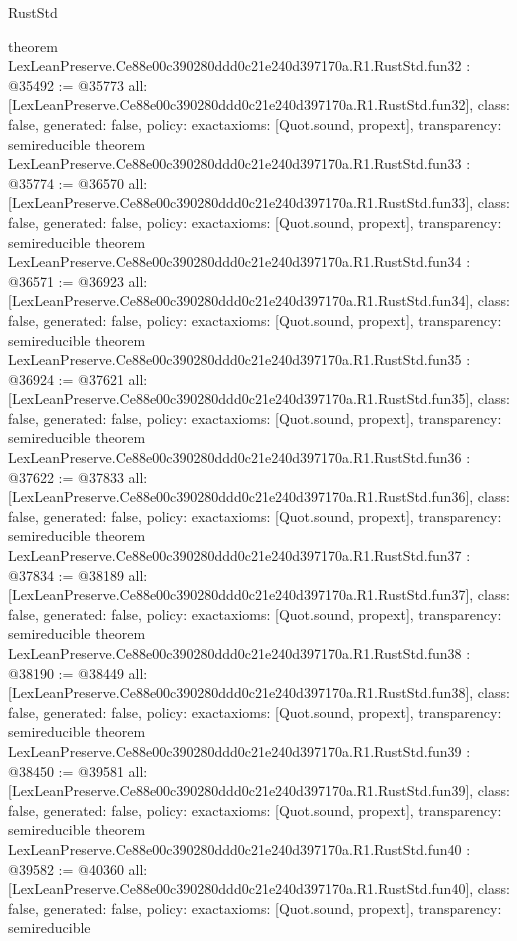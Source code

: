 \begin{lexlean}{RustStd}
\begin{coremodule}
{}
theorem LexLeanPreserve.Ce88e00c390280ddd0c21e240d397170a.R1.RustStd.fun32 : @35492 := @35773 {
  all: [LexLeanPreserve.Ce88e00c390280ddd0c21e240d397170a.R1.RustStd.fun32],
  class: false,
  generated: false,
  policy: exact{axioms: [Quot.sound, propext]},
  transparency: semireducible
}
theorem LexLeanPreserve.Ce88e00c390280ddd0c21e240d397170a.R1.RustStd.fun33 : @35774 := @36570 {
  all: [LexLeanPreserve.Ce88e00c390280ddd0c21e240d397170a.R1.RustStd.fun33],
  class: false,
  generated: false,
  policy: exact{axioms: [Quot.sound, propext]},
  transparency: semireducible
}
theorem LexLeanPreserve.Ce88e00c390280ddd0c21e240d397170a.R1.RustStd.fun34 : @36571 := @36923 {
  all: [LexLeanPreserve.Ce88e00c390280ddd0c21e240d397170a.R1.RustStd.fun34],
  class: false,
  generated: false,
  policy: exact{axioms: [Quot.sound, propext]},
  transparency: semireducible
}
theorem LexLeanPreserve.Ce88e00c390280ddd0c21e240d397170a.R1.RustStd.fun35 : @36924 := @37621 {
  all: [LexLeanPreserve.Ce88e00c390280ddd0c21e240d397170a.R1.RustStd.fun35],
  class: false,
  generated: false,
  policy: exact{axioms: [Quot.sound, propext]},
  transparency: semireducible
}
theorem LexLeanPreserve.Ce88e00c390280ddd0c21e240d397170a.R1.RustStd.fun36 : @37622 := @37833 {
  all: [LexLeanPreserve.Ce88e00c390280ddd0c21e240d397170a.R1.RustStd.fun36],
  class: false,
  generated: false,
  policy: exact{axioms: [Quot.sound, propext]},
  transparency: semireducible
}
theorem LexLeanPreserve.Ce88e00c390280ddd0c21e240d397170a.R1.RustStd.fun37 : @37834 := @38189 {
  all: [LexLeanPreserve.Ce88e00c390280ddd0c21e240d397170a.R1.RustStd.fun37],
  class: false,
  generated: false,
  policy: exact{axioms: [Quot.sound, propext]},
  transparency: semireducible
}
theorem LexLeanPreserve.Ce88e00c390280ddd0c21e240d397170a.R1.RustStd.fun38 : @38190 := @38449 {
  all: [LexLeanPreserve.Ce88e00c390280ddd0c21e240d397170a.R1.RustStd.fun38],
  class: false,
  generated: false,
  policy: exact{axioms: [Quot.sound, propext]},
  transparency: semireducible
}
theorem LexLeanPreserve.Ce88e00c390280ddd0c21e240d397170a.R1.RustStd.fun39 : @38450 := @39581 {
  all: [LexLeanPreserve.Ce88e00c390280ddd0c21e240d397170a.R1.RustStd.fun39],
  class: false,
  generated: false,
  policy: exact{axioms: [Quot.sound, propext]},
  transparency: semireducible
}
theorem LexLeanPreserve.Ce88e00c390280ddd0c21e240d397170a.R1.RustStd.fun40 : @39582 := @40360 {
  all: [LexLeanPreserve.Ce88e00c390280ddd0c21e240d397170a.R1.RustStd.fun40],
  class: false,
  generated: false,
  policy: exact{axioms: [Quot.sound, propext]},
  transparency: semireducible
}
\end{coremodule}
\end{lexlean}
